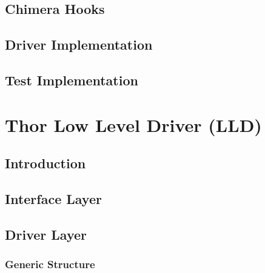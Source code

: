 \documentclass[10pt, letterpaper, tikz]{article}
\begin{document}
  \subsection{Chimera Hooks}




  \subsection{Driver Implementation}




  \subsection{Test Implementation}




  \pagebreak
  \section{Thor Low Level Driver (LLD)}
  \subsection{Introduction}

  \subsection{Interface Layer}



  \subsection{Driver Layer}

  \subsubsection{Generic Structure}

\end{document}
